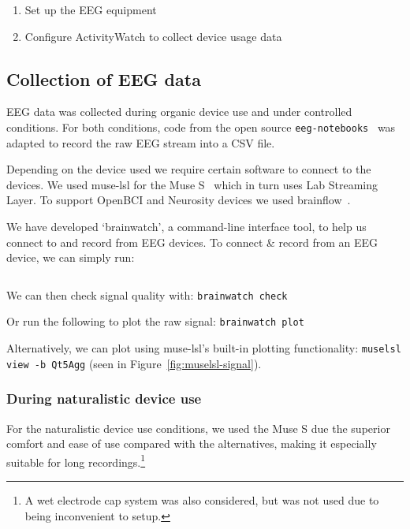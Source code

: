 \begin{enumerate}
    \item Set up the EEG equipment
    \item Configure ActivityWatch to collect device usage data
\end{enumerate}

    \subsection{Collection of EEG data}

        EEG data was collected during organic device use and under controlled conditions. For both conditions, code from the open source \texttt{eeg-notebooks}~\cite{barachant_eeg-notebooks_2020} was adapted to record the raw EEG stream into a CSV file.

        Depending on the device used we require certain software to connect to the devices. We used muse-lsl for the Muse S~\cite{muse-lsl} which in turn uses Lab Streaming Layer. To support OpenBCI and Neurosity devices we used brainflow~\cite{noauthor_brainflow_2020}.

        We have developed `brainwatch', a command-line interface tool, to help us connect to and record from EEG devices. To connect \& record from an EEG device, we can simply run:

        \inputminted{bash}{figures/brainwatch-example.txt}

        We can then check signal quality with: \texttt{brainwatch check}

        Or run the following to plot the raw signal: \texttt{brainwatch plot}

        Alternatively, we can plot using muse-lsl's built-in plotting functionality: \texttt{muselsl view -b Qt5Agg} (seen in Figure~\ref{fig:muselsl-signal}).

        \subsubsection*{During naturalistic device use}\label{section:collect-eeg-naturalistic}

            For the naturalistic device use conditions, we used the Muse S due the superior comfort and ease of use compared with the alternatives, making it especially suitable for long recordings.\footnote{A wet electrode cap system was also considered, but was not used due to being inconvenient to setup.}


